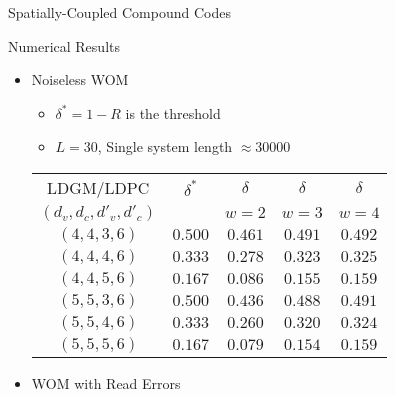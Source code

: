 \documentclass{beamer}
\newlength{\threecolwid}
\newlength{\itemspace}
\newlength{\subitemspace}
\begin{document}
\begin{frame}
\begin{columns}[t]
 
  \begin{column}{\threecolwid}

    \vspace{0.25cm}
\begin{block}{Spatially-Coupled Compound Codes}
  \begin{center}
    \scalebox{1.5}{}
  \end{center}
 \end{block}

\vspace{2cm}
\begin{block}{Numerical Results}
\begin{itemize}
\item Noiseless WOM
\vspace{\subitemspace}
\begin{itemize}
\item $\delta^{*}=1-R$ is the threshold
\item $L=30$, Single system length $\approx 30000$
\end{itemize}
\vspace{\subitemspace}
\begin{center}
\begin{tabular}{|c|c|c|c|c|}
\hline
LDGM/LDPC & $\delta^{*}$ & $\delta$ & $\delta$ & $\delta$ \\
$(d_v,d_c,d'_v,d'_c)$ & & $w=2$ & $w=3$ & $w=4$ \\
\hline
$(4,4,3,6)$  & $0.500$ & $0.461$ & $0.491$ & $0.492$\\
$(4,4,4,6)$  & $0.333$ & $0.278$ & $0.323$ & $0.325$\\
$(4,4,5,6)$  & $0.167$ & $0.086$ & $0.155$ & $0.159$\\
$(5,5,3,6)$  & $0.500$ & $0.436$ & $0.488$ & $0.491$\\
$(5,5,4,6)$  & $0.333$ & $0.260$ & $0.320$ & $0.324$\\
$(5,5,5,6)$  & $0.167$ & $0.079$ & $0.154$ & $0.159$\\
\hline  
\end{tabular}
\end{center}
\item \vspace{\itemspace}WOM with Read Errors

\end{itemize}
\end{block}
\end{column}
\end{columns}
\end{frame}
\end{document}
